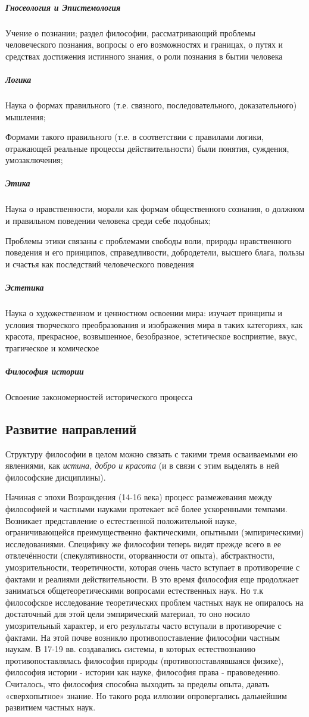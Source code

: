 \documentclass[a4paper, 12pt]{article}
\theoremstyle{plain} %
\theoremstyle{definition} %
\theoremstyle{remark} %
\begin{document}
\subparagraph{Гносеология и Эпистемология}
    Учение о познании; раздел философии, рассматривающий проблемы человеческого познания, вопросы о его возможностях и границах, о путях и средствах достижения истинного знания, о роли познания в бытии человека

\subparagraph{Логика}
    Наука о формах правильного (т.е. связного, последовательного, доказательного) мышления;

     Формами такого правильного (т.е. в соответствии с правилами логики, отражающей реальные процессы действительности) были понятия, суждения, умозаключения;
\subparagraph{Этика}
    Наука о нравственности, морали как формам общественного сознания, о должном и правильном поведении человека среди себе подобных;

    Проблемы этики связаны с проблемами свободы воли, природы нравственного поведения и его принципов, справедливости, добродетели, высшего блага, пользы и счастья как последствий человеческого поведения

\subparagraph{Эстетика}
    Наука о художественном и ценностном освоении мира: изучает принципы и условия творческого преобразования и
    изображения мира в таких категориях, как красота, прекрасное, возвышенное, безобразное, эстетическое восприятие, вкус, трагическое и комическое

\subparagraph{Философия истории} Освоение закономерностей исторического процесса

\subsection{Развитие направлений}
Структуру философии в целом можно связать с такими тремя осваиваемыми ею явлениями, как \emph{истина, добро и красота} (и в связи с этим выделять в ней философские дисциплины).

\vspace{1em}
Начиная с эпохи Возрождения (14-16 века) процесс размежевания между философией и частными науками протекает всё более ускоренными темпами.
Возникает представление о естественной положительной науке, ограничивающейся преимущественно фактическими, опытными (эмпирическими) исследованиями. Специфику же философии теперь видят прежде всего в ее отвлечённости (спекулятивности, оторванности от опыта), абстрактности, умозрительности, теоретичности, которая очень часто вступает в противоречие с фактами и реалиями действительности. В это время философия еще продолжает заниматься общетеоретическими вопросами естественных наук. Но т.к философское исследование теоретических проблем частных наук не опиралось на достаточный для этой цели эмпирический материал, то оно носило умозрительный характер, и его результаты часто вступали в противоречие с фактами. На этой почве возникло противопоставление философии частным наукам. В 17-19 вв. создавались системы, в которых естествознанию противопоставлялась философия природы (противопоставлявшаяся физике), философия истории - истории как науке, философия права - правоведению. Считалось, что философия способна выходить за пределы опыта, давать «сверхопытное» знание. Но такого рода иллюзии опровергались дальнейшим развитием частных наук.
\end{document}

